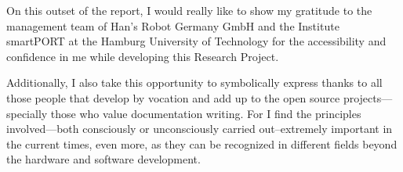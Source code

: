 On this outset of the report, I would really like to show my gratitude to 
the management team of Han's Robot Germany GmbH and the Institute smartPORT 
at the Hamburg University of Technology for the
accessibility and confidence in me while developing this Research Project.


Additionally, I also take this opportunity to symbolically express thanks
to all those people that develop by vocation and add up to the open source
projects---specially those who value documentation writing. 
For I find the principles involved---both consciously or unconsciously 
carried out--extremely important in the current
times, even more, as they can be recognized in different fields beyond the 
hardware and software development. 

